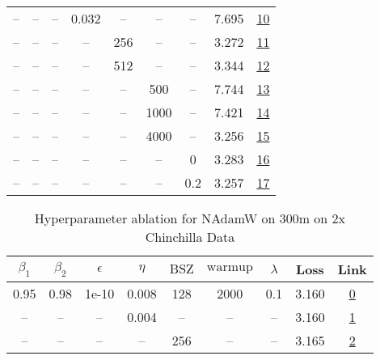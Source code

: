 \begin{table}[H]
\begin{tabular}{ccccccccc}
-- & -- & -- & 0.032 & -- & -- & -- & 7.695 & \href{https://wandb.ai/stanford-mercury/optimizer-scaling/runs/sweep-300m-6B-nadamw33ba92lr0.032-wd0.1-minlr0-warmup2000-b10.95-131dc6}{10} \\
-- & -- & -- & -- & 256 & -- & -- & 3.272 & \href{https://wandb.ai/stanford-mercury/optimizer-scaling/runs/sweep-300m-6B-nadamwac3d1clr0.008-wd0.1-minlr0-warmup2000-b10.95-62f9ad}{11} \\
-- & -- & -- & -- & 512 & -- & -- & 3.344 & \href{https://wandb.ai/stanford-mercury/optimizer-scaling/runs/sweep-300m-6B-nadamw3e994elr0.008-wd0.1-minlr0-warmup2000-b10.95-41f06f}{12} \\
-- & -- & -- & -- & -- & 500 & -- & 7.744 & \href{https://wandb.ai/stanford-mercury/optimizer-scaling/runs/sweep-300m-6B-nadamw38bf56lr0.008-wd0.1-minlr0-warmup500-b10.95--60b55d}{13} \\
-- & -- & -- & -- & -- & 1000 & -- & 7.421 & \href{https://wandb.ai/stanford-mercury/optimizer-scaling/runs/sweep-300m-6B-nadamw893e1dlr0.008-wd0.1-minlr0-warmup1000-b10.95-62bb8f}{14} \\
-- & -- & -- & -- & -- & 4000 & -- & 3.256 & \href{https://wandb.ai/stanford-mercury/optimizer-scaling/runs/sweep-300m-6B-nadamw7d5985lr0.008-wd0.1-minlr0-warmup4000-b10.95-876f95}{15} \\
-- & -- & -- & -- & -- & -- & 0 & 3.283 & \href{https://wandb.ai/stanford-mercury/optimizer-scaling/runs/sweep-300m-6B-nadamwe5c125lr0.008-wd0-minlr0-warmup2000-b10.95-b-2568cb}{16} \\
-- & -- & -- & -- & -- & -- & 0.2 & 3.257 & \href{https://wandb.ai/stanford-mercury/optimizer-scaling/runs/sweep-300m-6B-nadamw261788lr0.008-wd0.2-minlr0-warmup2000-b10.95-157b6b}{17} \\
\bottomrule
\end{tabular}
\end{table}

\begin{table}[H]
\centering
\caption{Hyperparameter ablation for NAdamW on 300m on 2x Chinchilla Data}
\label{tab:ablation_nadamw_300m_2}
\begin{tabular}{ccccccccc}
\toprule
$\beta_1$ & $\beta_2$ & $\epsilon$ & $\eta$ & $\mathrm{BSZ}$ & $\mathrm{warmup}$ & $\lambda$ & Loss & Link \\
\midrule
0.95 & 0.98 & 1e-10 & 0.008 & 128 & 2000 & 0.1 & 3.160 & \href{https://wandb.ai/stanford-mercury/optimizer-scaling/runs/sweep-300m-12B-nadamwd89df2lr0.008-wd0.1-minlr0-warmup2000-b10.9-07cb43}{0} \\
\midrule
-- & -- & -- & 0.004 & -- & -- & -- & 3.160 & \href{https://wandb.ai/stanford-mercury/optimizer-scaling/runs/sweep-300m-12B-nadamw59ffb0lr0.004-wd0.1-minlr0-warmup2000-b10.9-f2e4bd}{1} \\
-- & -- & -- & -- & 256 & -- & -- & 3.165 & \href{https://wandb.ai/stanford-mercury/optimizer-scaling/runs/sweep-300m-12B-nadamwf15cf6lr0.008-wd0.1-minlr0-warmup2000-b10.9-3065ca}{2} \\
\bottomrule
\end{tabular}
\end{table}

